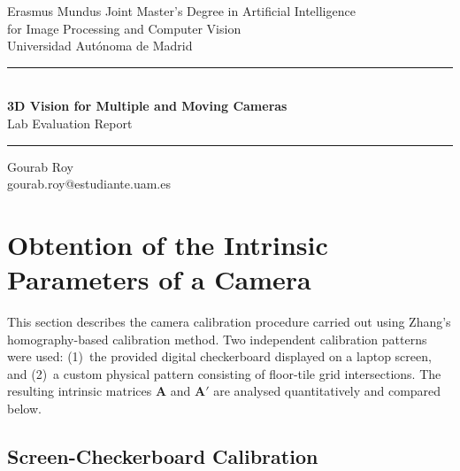 \documentclass[11pt,a4paper]{article}
\begin{document}
\hypersetup{pageanchor=false}
\begin{titlepage}
\thispagestyle{empty}
\begin{center}
    {\large Erasmus Mundus Joint Master's Degree in Artificial Intelligence}\\[0.15cm]
    {\large for Image Processing and Computer Vision}\\[0.25cm]
    {\large Universidad Aut\'onoma de Madrid}

    \vspace{3.0cm}

    \rule{0.82\textwidth}{0.6pt}\\[0.65cm]
    {\LARGE\bfseries 3D Vision for Multiple and Moving Cameras}\\[0.35cm]
    {\Large Lab Evaluation Report}\\[0.65cm]
    \rule{0.82\textwidth}{0.6pt}

    \vspace{2.3cm}

    {\Large Gourab Roy}\\[0.2cm]
    {\large gourab.roy@estudiante.uam.es}
\end{center}
\end{titlepage}
\hypersetup{pageanchor=true}

\section{Obtention of the Intrinsic Parameters of a Camera}

This section describes the camera calibration procedure carried out using
Zhang's homography-based calibration method. Two independent calibration patterns were used:
(1)~the provided digital checkerboard displayed on a laptop screen, and
(2)~a custom physical pattern consisting of floor-tile grid intersections.  The
resulting intrinsic matrices $\mathbf{A}$ and $\mathbf{A}'$ are analysed
quantitatively and compared below.

\subsection{Screen-Checkerboard Calibration}
\label{sec:screen_calib}
\end{document}
